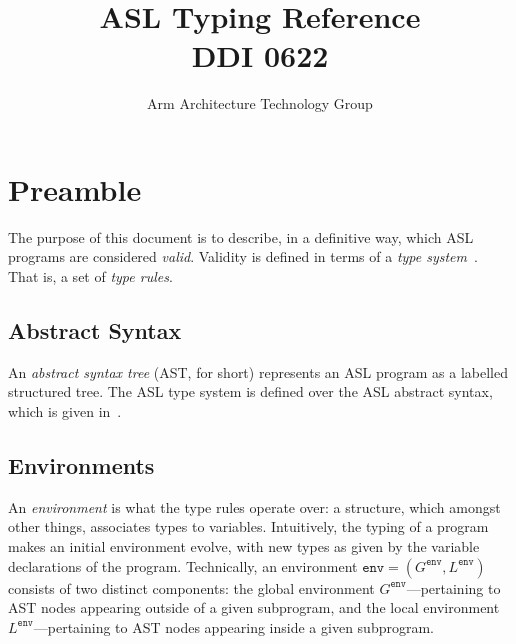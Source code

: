 \documentclass{book}
\author{Arm Architecture Technology Group}
\title{ASL Typing Reference \\ 
       DDI 0622}
\newcommand\tenv[0]{\texttt{env}}
\begin{document}
\maketitle

\tableofcontents{}





\chapter{Preamble}

The purpose of this document is to describe, in a definitive way, which ASL programs are considered \emph{valid}. Validity is defined in terms of a \emph{type system}~\cite{TypeSystemsLucaCardelli}. That is, a set of \emph{type rules}.

\section{Abstract Syntax}
An \emph{abstract syntax tree} (AST, for short) represents an ASL program as a labelled structured tree. 
%
The ASL type system is defined over the ASL abstract syntax, which is given in~\cite{ASLAbstractSyntaxReference}.

\section{Environments}

An \emph{environment} is what the type rules operate over: a structure, which amongst
other things, associates types to variables. Intuitively, the typing of a
program makes an initial environment evolve, with new types as given by the
variable declarations of the program.
%
Technically, an environment $\tenv=(G^\tenv, L^\tenv)$ consists of two
distinct components: the global environment $G^\tenv$---pertaining to AST nodes
appearing outside of a given subprogram, and the local environment
$L^\tenv$---pertaining to AST nodes appearing inside a given subprogram.
\end{document}
